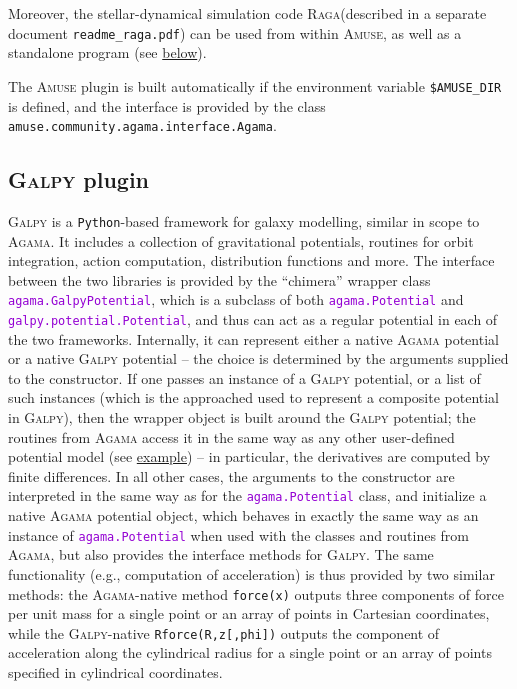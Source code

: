 \documentclass[12pt]{article}
\newcommand{\Agama}{\textsc{Agama}\xspace}
\newcommand{\Amuse}{\textsc{Amuse}\xspace}
\newcommand{\Galpy}{\textsc{Galpy}\xspace}
\newcommand{\Raga} {\textsc{Raga}\xspace}
\newcommand{\Python}{\texttt{Python}\xspace}
\newcommand{\ttt}[1]{\textcolor{darkviolet}{\texttt{#1}}}
\begin{document}
Moreover, the stellar-dynamical simulation code \Raga (described in a separate document \texttt{readme_raga.pdf}) can be used from within \Amuse, as well as a standalone program (see \hyperref[sec:raga]{below}).

The \Amuse plugin is built automatically if the environment variable \texttt{\$AMUSE_DIR} is defined, and the interface is provided by the class \texttt{amuse.community.agama.interface.Agama}.


\subsection{\Galpy plugin}  \label{sec:Galpy}

\Galpy \cite{Bovy2015} is a \Python-based framework for galaxy modelling, similar in scope to \Agama. It includes a collection of gravitational potentials, routines for orbit integration, action computation, distribution functions and more. 
The interface between the two libraries is provided by the ``chimera'' wrapper class \ttt{agama.GalpyPotential}, which is a subclass of both \ttt{agama.Potential} and \ttt{galpy.potential.Potential}, and thus can act as a regular potential in each of the two frameworks. Internally, it can represent either a native \Agama potential or a native \Galpy potential -- the choice is determined by the arguments supplied to the constructor. If one passes an instance of a \Galpy potential, or a list of such instances (which is the approached used to represent a composite potential in \Galpy), then the wrapper object is built around the \Galpy potential; the routines from \Agama access it in the same way as any other user-defined potential model (see \hyperref[sec:PythonPotential]{example}) -- in particular, the derivatives are computed by finite differences. In all other cases, the arguments to the constructor are interpreted in the same way as for the \ttt{agama.Potential} class, and initialize a native \Agama potential object, which behaves in exactly the same way as an instance of \ttt{agama.Potential} when used with the classes and routines from \Agama, but also provides the interface methods for \Galpy. The same functionality (e.g., computation of acceleration) is thus provided by two similar methods: the \Agama-native method \texttt{force(x)} outputs three components of force per unit mass for a single point or an array of points in Cartesian coordinates, while the \Galpy-native \texttt{Rforce(R,z[,phi])} outputs the component of acceleration along the cylindrical radius for a single point or an array of points specified in cylindrical coordinates.
\end{document}
